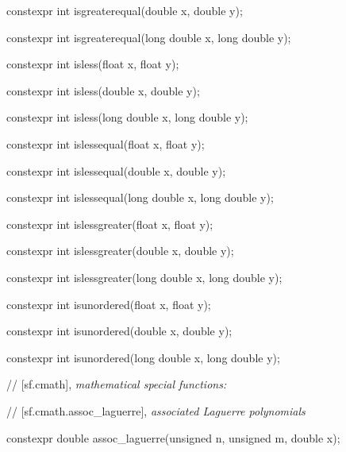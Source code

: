 \documentclass[prd,twocolumn,amsmath,amssymb,nofootinbib,eqsecnum]{revtex4-1}
\newcommand{\highlight}[1]{{\color{red} #1}}
\newcommand{\oldhighlight}[1]{{\color{green} #1}}
\newcommand{\bigund}{{\Huge{\_}}}
\begin{document}
{\oldhighlight{constexpr} int isgreaterequal(double x, double y);

\oldhighlight{constexpr} int isgreaterequal(long double x, long double y);

\vspace{2ex}


\oldhighlight{constexpr} int isless(float x, float y);

\oldhighlight{constexpr} int isless(double x, double y);

\oldhighlight{constexpr} int isless(long double x, long double y);

\vspace{2ex}


\oldhighlight{constexpr} int islessequal(float x, float y);

\oldhighlight{constexpr} int islessequal(double x, double y);

\oldhighlight{constexpr} int islessequal(long double x, long double y);

\vspace{2ex}


\oldhighlight{constexpr} int islessgreater(float x, float y);

\oldhighlight{constexpr} int islessgreater(double x, double y);

\oldhighlight{constexpr} int islessgreater(long double x, long double y);

\vspace{2ex}


\oldhighlight{constexpr} int isunordered(float x, float y);

\oldhighlight{constexpr} int isunordered(double x, double y);

\oldhighlight{constexpr} int isunordered(long double x, long double y);

\vspace{2ex}

// [sf.cmath], {\it mathematical special functions:}

\vspace{2ex}

// [sf.cmath.assoc\bigund laguerre], {\it associated Laguerre polynomials}

\vspace{2ex}

\highlight{constexpr} double assoc\_laguerre(unsigned n, unsigned m, double x);
	
}
\end{document}
